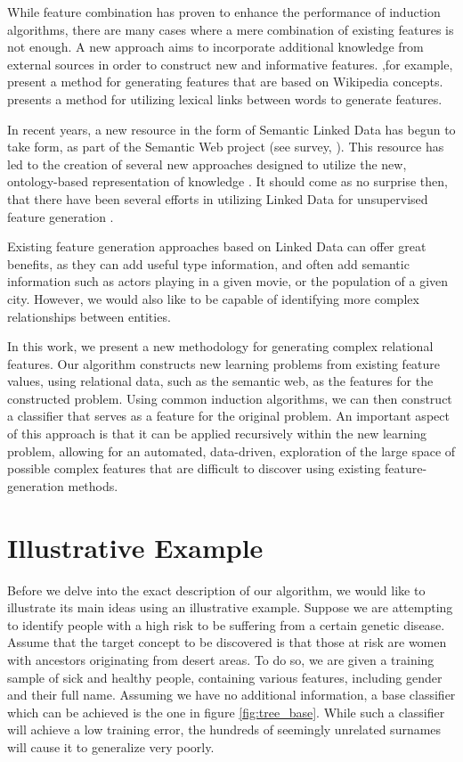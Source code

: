 \documentclass{article}
\theoremstyle{definition}
\begin{document}
While feature combination has proven to enhance the performance of induction algorithms, there are many cases where a mere combination of existing features is not enough. A new approach aims to incorporate additional knowledge from external sources in order to construct new and informative features.
\citet{gabrilovich2009wikipedia} ,for example, present a method for generating features that are based on Wikipedia concepts. \citet{jarmasz2012roget} presents a method for utilizing lexical links between words to generate features.

In recent years, a new resource in the form of Semantic Linked Data has begun to take form, as part of the Semantic Web project (see survey, \citet{bizer2009linked}). This resource has led to the creation of several new approaches designed to utilize the new, ontology-based representation of knowledge \citep{losch2012graph,rios2014statistical}.
It should come as no surprise then, that there have been several efforts in utilizing Linked Data for unsupervised feature generation \citep{cheng2011automated, paulheim2012unsupervised}.

Existing feature generation approaches based on Linked Data can offer great benefits, as they can add useful type information, and often add semantic information such as actors playing in a given movie, or the population of a given city.
However, we would also like to be capable of identifying more complex relationships between entities.

In this work, we present a new methodology for generating complex relational features.  Our algorithm constructs new learning problems from existing feature values, using relational data, such as the semantic web, as the features for the constructed problem.
Using common induction algorithms, we can then construct a classifier that serves as a feature for the original problem. An important aspect of this approach is that it can be applied recursively within the new learning problem, allowing for an automated, data-driven, exploration of the large space of possible  complex features that are difficult to discover using existing feature-generation methods.

\section{Illustrative Example}

Before we delve into the exact description of our algorithm, we would like to illustrate its main ideas using an illustrative example.
Suppose we are attempting to identify people with a high risk to be suffering from a certain genetic disease. Assume that the target concept to be discovered is that those at risk are women with ancestors originating from desert areas. To do so, we are given a training sample of sick and healthy people, containing various features, including gender and their full name.
Assuming we have no additional information, a base classifier which can be achieved is the one in figure \ref{fig:tree_base}. While such a classifier will achieve a low training error, the hundreds of seemingly unrelated surnames will cause it to generalize very poorly.
\end{document}
